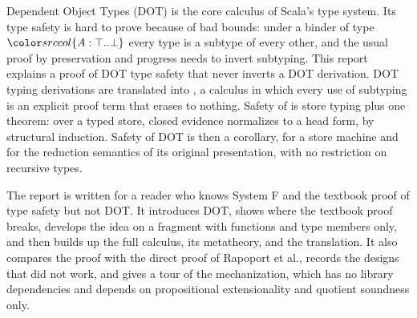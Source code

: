Dependent Object Types (DOT) is the core calculus of Scala's type system. Its type safety is hard to prove because of bad bounds: under a binder of type $\dtyp{A}{\top}{\bot}$ every type is a subtype of every other, and the usual proof by preservation and progress needs to invert subtyping. This report explains a proof of DOT type safety that never inverts a DOT derivation. DOT typing derivations are translated into \FCdot, a calculus in which every use of subtyping is an explicit proof term that erases to nothing. Safety of \FCdot is store typing plus one theorem: over a typed store, closed evidence normalizes to a head form, by structural induction. Safety of DOT is then a corollary, for a store machine and for the reduction semantics of its original presentation, with no restriction on recursive types.

The report is written for a reader who knows System F and the textbook proof of type safety but not DOT. It introduces DOT, shows where the textbook proof breaks, develops the idea on a fragment with functions and type members only, and then builds up the full calculus, its metatheory, and the translation. It also compares the proof with the direct proof of Rapoport et al., records the designs that did not work, and gives a tour of the \Lean mechanization, which has no library dependencies and depends on propositional extensionality and quotient soundness only.
